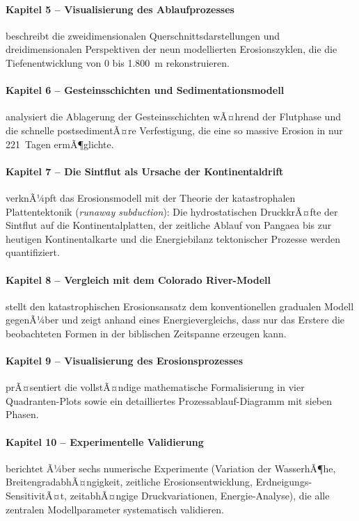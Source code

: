 ﻿\documentclass[12pt,a4paper]{report}
\begin{document}
\paragraph{Kapitel 5 -- Visualisierung des Ablaufprozesses}
beschreibt die zweidimensionalen Querschnittsdarstellungen und dreidimensionalen Perspektiven der neun modellierten Erosionszyklen, die die Tiefenentwicklung von 0 bis 1.800~m rekonstruieren.

\paragraph{Kapitel 6 -- Gesteinsschichten und Sedimentationsmodell}
analysiert die Ablagerung der Gesteinsschichten wÃ¤hrend der Flutphase und die schnelle postsedimentÃ¤re Verfestigung, die eine so massive Erosion in nur 221~Tagen ermÃ¶glichte.

\paragraph{Kapitel 7 -- Die Sintflut als Ursache der Kontinentaldrift}
verknÃ¼pft das Erosionsmodell mit der Theorie der katastrophalen Plattentektonik (\textit{runaway subduction}): Die hydrostatischen DruckkrÃ¤fte der Sintflut auf die Kontinentalplatten, der zeitliche Ablauf von Pangaea bis zur heutigen Kontinentalkarte und die Energiebilanz tektonischer Prozesse werden quantifiziert.

\paragraph{Kapitel 8 -- Vergleich mit dem Colorado River-Modell}
stellt den katastrophischen Erosionsansatz dem konventionellen gradualen Modell gegenÃ¼ber und zeigt anhand eines Energievergleichs, dass nur das Erstere die beobachteten Formen in der biblischen Zeitspanne erzeugen kann.

\paragraph{Kapitel 9 -- Visualisierung des Erosionsprozesses}
prÃ¤sentiert die vollstÃ¤ndige mathematische Formalisierung in vier Quadranten-Plots sowie ein detailliertes Prozessablauf-Diagramm mit sieben Phasen.

\paragraph{Kapitel 10 -- Experimentelle Validierung}
berichtet Ã¼ber sechs numerische Experimente (Variation der WasserhÃ¶he, BreitengradabhÃ¤ngigkeit, zeitliche Erosionsentwicklung, Erdneigungs-SensitivitÃ¤t, zeitabhÃ¤ngige Druckvariationen, Energie-Analyse), die alle zentralen Modellparameter systematisch validieren.
\end{document}
